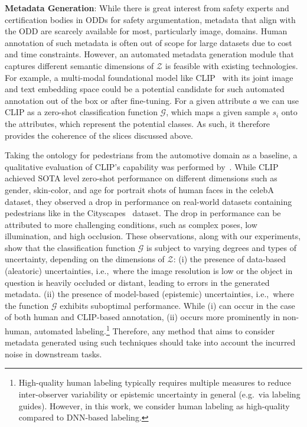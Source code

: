 \textbf{Metadata Generation}:  While there is great interest from safety experts and certification bodies in ODDs for safety argumentation, metadata that align with the ODD are scarcely available for most, particularly image, domains.
Human annotation of such metadata is often out of scope for large datasets due to cost and time constraints.
However, an automated metadata generation module that captures different semantic dimensions of $\mathcal{Z}$ is feasible with existing technologies. 
For example, a multi-modal foundational model like CLIP~\citep{radford2021learning} with its joint image and text embedding space could be a potential candidate for such automated annotation out of the box or after fine-tuning. 
For a given attribute $a$ we can use CLIP as a zero-shot classification function $\mathcal G$, which maps a given sample $s_i$ onto the attributes, which represent the potential classes. As such, it therefore provides the coherence of the slices discussed above.

Taking the ontology for pedestrians from the automotive domain as a baseline, a qualitative evaluation of CLIP's capability was performed by~\citet{gannamaneni2023investigating}.
While CLIP achieved SOTA level zero-shot performance on different dimensions such as gender, skin-color, and age for portrait shots of human faces in the celebA~\citep{liu2015faceattributes} dataset, they observed a drop in performance on real-world datasets containing pedestrians like in the Cityscapes~\citep{cordts2016cityscapes} dataset.
The drop in performance can be attributed to more challenging conditions, such as complex poses, low illumination, and high occlusion. 
These observations, along with our experiments, show that the classification function $\mathcal G$ is subject to varying degrees and types of uncertainty, depending on the dimensions of $\mathcal Z$:
(i) the presence of data-based (aleatoric) uncertainties, i.e.,\ where the image resolution is low or the object in question is heavily occluded or distant, leading to errors in the generated metadata. (ii) the presence of model-based (epistemic) uncertainties, i.e.,\ where the function $\mathcal G$ exhibits suboptimal performance. While (i) can occur in the case of both human and CLIP-based annotation, (ii) occurs more prominently in non-human, automated labeling.\footnote{High-quality human labeling typically requires multiple measures to reduce inter-observer variability or epistemic uncertainty in general (e.g.\ via labeling guides). However, in this work, we consider human labeling as high-quality compared to DNN-based labeling.} Therefore, any method that aims to consider metadata generated using such techniques should take into account the incurred noise in downstream tasks.

